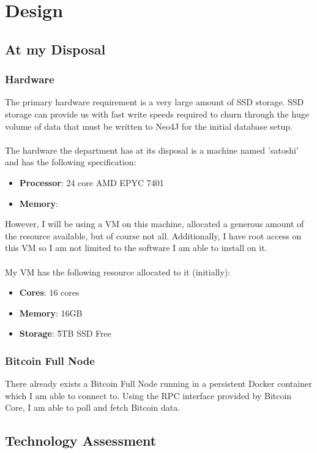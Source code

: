 \chapter{Design}

\section{At my Disposal} 

\subsection{Hardware}
The primary hardware requirement is a very large amount of SSD storage. SSD storage can provide us with fast write speeds required to churn through the huge volume of data that must be written to Neo4J for the initial database setup.
\\\\
The hardware the department has at its disposal is a machine named 'satoshi' and has the following specification:
\begin{itemize}
    \item \textbf{Processor}: 24 core AMD EPYC 7401 
    \item \textbf{Memory}: 
\end{itemize}
However, I will be using a VM on this machine, allocated a generous amount of the resource available, but of course not all. Additionally, I have root access on this VM so I am not limited to the software I am able to install on it. 
\\\\
My VM has the following resource allocated to it (initially):
\begin{itemize}
    \item \textbf{Cores}: 16 cores 
    \item \textbf{Memory}: 16GB
    \item \textbf{Storage}: \~5TB SSD Free
\end{itemize}

\subsection{Bitcoin Full Node}
There already exists a Bitcoin Full Node running in a persistent Docker container which I am able to connect to. Using the RPC interface provided by Bitcoin Core, I am able to poll and fetch Bitcoin data. 

\section{Technology Assessment}


